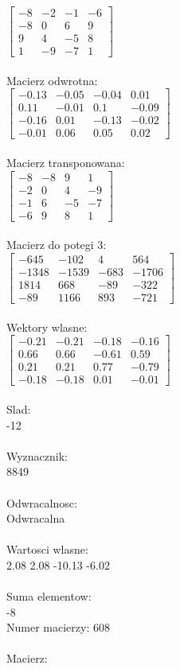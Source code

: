 \documentclass[a4paper,12pt]{article}
\begin{document}
$\begin{bmatrix} -8&-2&-1&-6\\-8&0&6&9\\9&4&-5&8\\1&-9&-7&1 \end{bmatrix}$
\\
\\
Macierz odwrotna:\\

$\begin{bmatrix} -0.13&-0.05&-0.04&0.01\\0.11&-0.01&0.1&-0.09\\-0.16&0.01&-0.13&-0.02\\-0.01&0.06&0.05&0.02 \end{bmatrix}$
\\
\\
Macierz transponowana:\\

$\begin{bmatrix} -8&-8&9&1\\-2&0&4&-9\\-1&6&-5&-7\\-6&9&8&1 \end{bmatrix}$
\\
\\
Macierz do potegi 3:\\

$\begin{bmatrix} -645&-102&4&564\\-1348&-1539&-683&-1706\\1814&668&-89&-322\\-89&1166&893&-721 \end{bmatrix}$
\\
\\
Wektory wlasne:\\

$\begin{bmatrix} -0.21&-0.21&-0.18&-0.16\\0.66&0.66&-0.61&0.59\\0.21&0.21&0.77&-0.79\\-0.18&-0.18&0.01&-0.01 \end{bmatrix}$
\\
\\
Slad:\\
-12
\\
\\
Wyznacznik:\\
8849
\\
\\
Odwracalnosc:\\
Odwracalna
\\
\\
Wartosci wlasne:\\
2.08 2.08 -10.13 -6.02
\\
\\
Suma elementow:\\
-8
\\
\newpage
Numer macierzy:
608
\\
\\
Macierz:\\
\end{document}
